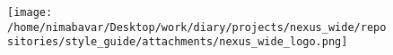 \documentclass[13pt]{scrarticle}
\begin{document}
    \begin{figure}[h!]

        \texttt{[image: /home/nimabavar/Desktop/work/diary/projects/nexus\_wide/repositories/style\_guide/attachments/nexus\_wide\_logo.png]}

    \end{figure}
\end{document}
